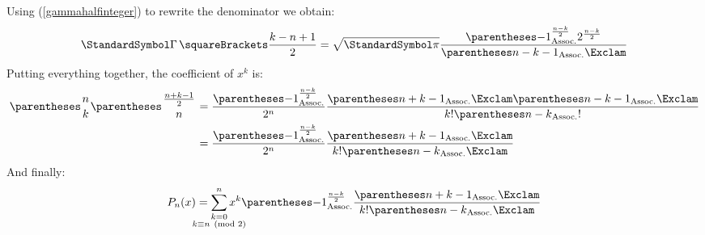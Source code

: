 \documentclass[10pt, a4paper, oneside]{basestyle}
\begin{document}
Using (\ref{gammahalfinteger}) to rewrite the denominator we obtain:
\begin{equation*}
\Gamma\of{\frac{k - n + 1}{2}} =
  \sqrt{\Pi}
  \frac
    {\pa{-1}^{\frac{n - k}{2}}{2^{\frac{n - k}{2}}}}
    {\DoubleFactorial{\pa{n - k - 1}}}
\end{equation*}
Putting everything together, the coefficient of $x^k$ is:
\begin{align*}
\binom{n}{k} \binom{\frac{n + k - 1}{2}}{n} &=
  \frac
    {\pa{-1}^{\frac{n - k}{2}}}
    {2^n}
  \frac
    {\DoubleFactorial{\pa{n + k - 1}}\DoubleFactorial{\pa{n - k - 1}}}
    {\Factorial{k}\Factorial{\pa{n - k}}}\\
&=
  \frac
    {\pa{-1}^{\frac{n - k}{2}}}
    {2^n}
  \frac
    {\DoubleFactorial{\pa{n + k - 1}}}
    {\Factorial{k}\DoubleFactorial{\pa{n - k}}}
\end{align*}
And finally:
\begin{equation*}
P_n(x) = \sum{\substack{k = 0\\ k \equiv n \pmod 2}}[n]
  x^k \pa{-1}^{\frac{n - k}{2}}
  \frac
    {\DoubleFactorial{\pa{n + k - 1}}}
    {\Factorial{k}\DoubleFactorial{\pa{n - k}}}
\end{equation*}
\end{document}

